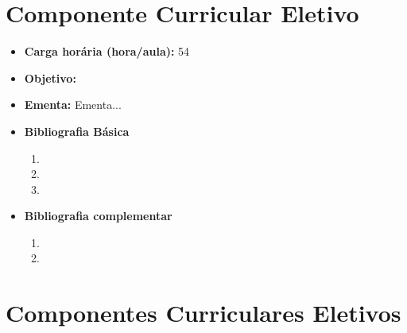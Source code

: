 \documentclass[
	10pt,				%
	openright,			%
	twoside,			%
	a4paper,			%
	english,			%
	french,				%
	brazil,				%
	sumario=tradicional
]{abntex2}
\begin{document}
\newpage
\section*{Componente Curricular Eletivo}\label{6_optb}
\begin{itemize}
	\item \textbf{Carga horária (hora/aula):} 54
	\item \textbf{Objetivo:} 
	\item \textbf{Ementa:} 
	Ementa...
	\item \textbf{Bibliografia Básica}
	\begin{enumerate}
		\item 
		\item 
		\item 
	\end{enumerate}
	\item \textbf{Bibliografia complementar}
	\begin{enumerate}
		\item 
		\item
	\end{enumerate} 	
\end{itemize}

\section*{Componentes Curriculares Eletivos}

\newpage
\end{document}
